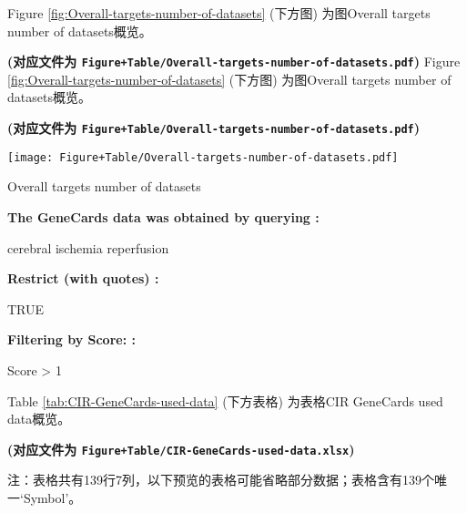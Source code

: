 \documentclass[
]{article}
\begin{document}
Figure \ref{fig:Overall-targets-number-of-datasets} (下方图) 为图Overall targets number of datasets概览。

\textbf{(对应文件为 \texttt{Figure+Table/Overall-targets-number-of-datasets.pdf})}
Figure \ref{fig:Overall-targets-number-of-datasets} (下方图) 为图Overall targets number of datasets概览。

\textbf{(对应文件为 \texttt{Figure+Table/Overall-targets-number-of-datasets.pdf})}

\def\@captype{figure}
\begin{center}
\texttt{[image: Figure+Table/Overall-targets-number-of-datasets.pdf]}
\caption{Overall targets number of datasets}\label{fig:Overall-targets-number-of-datasets}
\end{center}

\begin{center}\begin{tcolorbox}[colback=gray!10, colframe=gray!50, width=0.9\linewidth, arc=1mm, boxrule=0.5pt]
\textbf{
The GeneCards data was obtained by querying
:}

\vspace{0.5em}

    cerebral ischemia reperfusion

\vspace{2em}


\textbf{
Restrict (with quotes)
:}

\vspace{0.5em}

    TRUE

\vspace{2em}


\textbf{
Filtering by Score:
:}

\vspace{0.5em}

    Score > 1

\vspace{2em}
\end{tcolorbox}
\end{center}

Table \ref{tab:CIR-GeneCards-used-data} (下方表格) 为表格CIR GeneCards used data概览。

\textbf{(对应文件为 \texttt{Figure+Table/CIR-GeneCards-used-data.xlsx})}

\begin{center}\begin{tcolorbox}[colback=gray!10, colframe=gray!50, width=0.9\linewidth, arc=1mm, boxrule=0.5pt]注：表格共有139行7列，以下预览的表格可能省略部分数据；表格含有139个唯一`Symbol'。
\end{tcolorbox}
\end{center}
\end{document}
